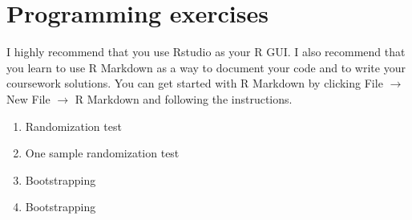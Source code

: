 \documentclass[12pt,a4paper]{article}
\begin{document}
\section*{Programming exercises}

I highly recommend that you use Rstudio as your R GUI. I also recommend that you learn to use R Markdown as a way to document your code and to write your coursework solutions. You can get started with R Markdown by clicking File $\rightarrow$ New File $\rightarrow$ R Markdown and following the instructions.

\begin{enumerate}

\item Randomization test


\item One sample randomization test

\item Bootstrapping

\item Bootstrapping

\end{enumerate}
\end{document}
